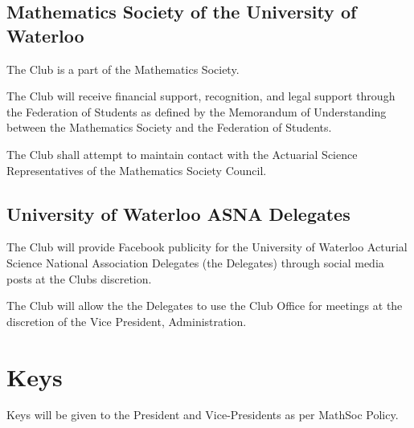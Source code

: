\documentclass[11pt]{mathsoc}
\begin{document}
\subsection{Mathematics Society of the University of Waterloo}
The Club is a part of the Mathematics Society.

The Club will receive financial support, recognition, and legal 
support through the Federation of Students as defined by the Memorandum of 
Understanding between the Mathematics Society and the Federation of Students.

The Club shall attempt to maintain contact with the Actuarial Science 
Representatives of the Mathematics Society Council.

\subsection{University of Waterloo ASNA Delegates}
The Club will provide Facebook publicity for the University of Waterloo
Acturial Science National Association Delegates (the Delegates) through social media posts
at the Clubs discretion.

The Club will allow the the Delegates to use the Club Office for meetings at the discretion
of the Vice President, Administration.

\section{Keys}
Keys will be given to the President and Vice-Presidents as per MathSoc Policy.
\end{document}
